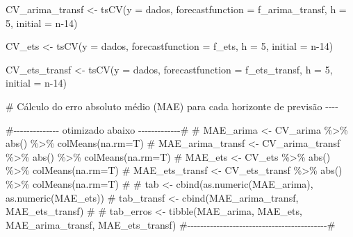 \documentclass[
  letterpaper,
  DIV=11,
  numbers=noendperiod]{scrartcl}
\newenvironment{Shaded}{\begin{snugshade}}{\end{snugshade}}
\newcommand{\AttributeTok}[1]{\textcolor[rgb]{0.40,0.45,0.13}{#1}}
\newcommand{\CommentTok}[1]{\textcolor[rgb]{0.37,0.37,0.37}{#1}}
\newcommand{\DecValTok}[1]{\textcolor[rgb]{0.68,0.00,0.00}{#1}}
\newcommand{\FunctionTok}[1]{\textcolor[rgb]{0.28,0.35,0.67}{#1}}
\newcommand{\NormalTok}[1]{\textcolor[rgb]{0.00,0.23,0.31}{#1}}
\newcommand{\OtherTok}[1]{\textcolor[rgb]{0.00,0.23,0.31}{#1}}
\begin{document}
\begin{Shaded}
\begin{Highlighting}[]
\NormalTok{CV\_arima\_transf }\OtherTok{\textless{}{-}} \FunctionTok{tsCV}\NormalTok{(}\AttributeTok{y =}\NormalTok{ dados, }\AttributeTok{forecastfunction =}\NormalTok{ f\_arima\_transf,}
                       \AttributeTok{h =} \DecValTok{5}\NormalTok{, }\AttributeTok{initial =}\NormalTok{ n}\DecValTok{{-}14}\NormalTok{)}

\NormalTok{CV\_ets }\OtherTok{\textless{}{-}} \FunctionTok{tsCV}\NormalTok{(}\AttributeTok{y =}\NormalTok{ dados, }\AttributeTok{forecastfunction =}\NormalTok{ f\_ets, }\AttributeTok{h =} \DecValTok{5}\NormalTok{, }\AttributeTok{initial =}\NormalTok{ n}\DecValTok{{-}14}\NormalTok{)}

\NormalTok{CV\_ets\_transf }\OtherTok{\textless{}{-}} \FunctionTok{tsCV}\NormalTok{(}\AttributeTok{y =}\NormalTok{ dados, }\AttributeTok{forecastfunction =}\NormalTok{ f\_ets\_transf,}
                     \AttributeTok{h =} \DecValTok{5}\NormalTok{, }\AttributeTok{initial =}\NormalTok{ n}\DecValTok{{-}14}\NormalTok{)}

\CommentTok{\# Cálculo do erro absoluto médio (MAE) para cada horizonte de previsão {-}{-}{-}{-}}

\CommentTok{\#{-}{-}{-}{-}{-}{-}{-}{-}{-}{-}{-}{-}{-}{-} otimizado abaixo {-}{-}{-}{-}{-}{-}{-}{-}{-}{-}{-}{-}{-}\#}
\CommentTok{\# MAE\_arima \textless{}{-} CV\_arima \%\textgreater{}\% abs() \%\textgreater{}\% colMeans(na.rm=T)}
\CommentTok{\# MAE\_arima\_transf \textless{}{-}  CV\_arima\_transf \%\textgreater{}\% abs() \%\textgreater{}\% colMeans(na.rm=T)}
\CommentTok{\# MAE\_ets \textless{}{-}  CV\_ets \%\textgreater{}\% abs() \%\textgreater{}\% colMeans(na.rm=T)}
\CommentTok{\# MAE\_ets\_transf \textless{}{-}  CV\_ets\_transf \%\textgreater{}\% abs() \%\textgreater{}\% colMeans(na.rm=T)}
\CommentTok{\# }
\CommentTok{\# tab \textless{}{-} cbind(as.numeric(MAE\_arima), as.numeric(MAE\_ets))}
\CommentTok{\# tab\_transf \textless{}{-} cbind(MAE\_arima\_transf, MAE\_ets\_transf)}
\CommentTok{\# }
\CommentTok{\# tab\_erros \textless{}{-}  tibble(MAE\_arima, MAE\_ets, MAE\_arima\_transf, MAE\_ets\_transf)}
\CommentTok{\#{-}{-}{-}{-}{-}{-}{-}{-}{-}{-}{-}{-}{-}{-}{-}{-}{-}{-}{-}{-}{-}{-}{-}{-}{-}{-}{-}{-}{-}{-}{-}{-}{-}{-}{-}{-}{-}{-}{-}{-}{-}{-}{-}\#}


\end{Highlighting}
\end{Shaded}
\end{document}
